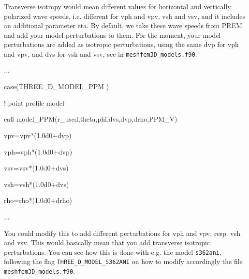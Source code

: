 \documentclass[oneside,english]{book}
\newenvironment{lyxcode}
{\begin{list}{}{
\setlength{\rightmargin}{\leftmargin}
\setlength{\listparindent}{0pt}%
\raggedright
\setlength{\itemsep}{0pt}
\setlength{\parsep}{0pt}
\normalfont\ttfamily}%
 \item[]}
{\end{list}}
\begin{document}
\begin{description}
\begin{enumerate}
  \item Transverse isotropy would mean different values for horizontal and vertically polarized wave speeds,
  i.e. different for vph and   vpv, vsh and vsv, and it includes an additional parameter eta.
  By default, we take these wave speeds from PREM and add your model perturbations to them.
  For the moment, your model perturbations are added as isotropic perturbations, using the same dvp for vph and vpv,
  and dvs for vsh   and vsv, see in \texttt{meshfem3D\_models.f90}:
  \begin{lyxcode}
{\footnotesize  ... }{\footnotesize \par}
{\footnotesize     case(THREE\_D\_MODEL\_PPM ) }{\footnotesize \par}
{\footnotesize       ! point profile model }{\footnotesize \par}
{\footnotesize       call model\_PPM(r\_used,theta,phi,dvs,dvp,drho,PPM\_V) }{\footnotesize \par}
{\footnotesize       vpv=vpv*(1.0d0+dvp) }{\footnotesize \par}
{\footnotesize       vph=vph*(1.0d0+dvp) }{\footnotesize \par}
{\footnotesize       vsv=vsv*(1.0d0+dvs) }{\footnotesize \par}
{\footnotesize       vsh=vsh*(1.0d0+dvs) }{\footnotesize \par}
{\footnotesize       rho=rho*(1.0d0+drho) }{\footnotesize \par}
{\footnotesize	... }{\footnotesize \par}
  \end{lyxcode}
 You could modify this to add different perturbations for vph and vpv, resp. vsh and vsv.
 This would basically mean that you add transverse isotropic perturbations.
 You can see how this is done with e.g. the model \texttt{s362ani},
 following the flag \texttt{THREE\_D\_MODEL\_S362ANI} on how to modify accordingly the file \texttt{meshfem3D\_models.f90}.


\end{enumerate}
\end{description}
\end{document}
